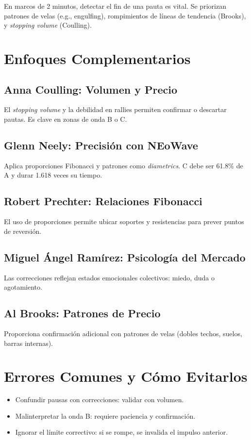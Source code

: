 En marcos de 2 minutos, detectar el fin de una pauta es vital. Se priorizan patrones de velas (e.g., engulfing), rompimientos de l\'ineas de tendencia (Brooks), y \textit{stopping volume} (Coulling).

\section{Enfoques Complementarios}

\subsection{Anna Coulling: Volumen y Precio}
El \textit{stopping volume} y la debilidad en rallies permiten confirmar o descartar pautas. Es clave en zonas de onda B o C.

\subsection{Glenn Neely: Precisi\'on con NEoWave}
Aplica proporciones Fibonacci y patrones como \textit{diametrics}. C debe ser 61.8\% de A y durar 1.618 veces su tiempo.

\subsection{Robert Prechter: Relaciones Fibonacci}
El uso de proporciones permite ubicar soportes y resistencias para prever puntos de reversi\'on.

\subsection{Miguel \'Angel Ram\'irez: Psicolog\'ia del Mercado}
Las correcciones reflejan estados emocionales colectivos: miedo, duda o agotamiento.

\subsection{Al Brooks: Patrones de Precio}
Proporciona confirmaci\'on adicional con patrones de velas (dobles techos, suelos, barras internas).

\section{Errores Comunes y C\'omo Evitarlos}

\begin{itemize}
    \item Confundir pausas con correcciones: validar con volumen.
    \item Malinterpretar la onda B: requiere paciencia y confirmaci\'on.
    \item Ignorar el l\'imite correctivo: si se rompe, se invalida el impulso anterior.
\end{itemize}

